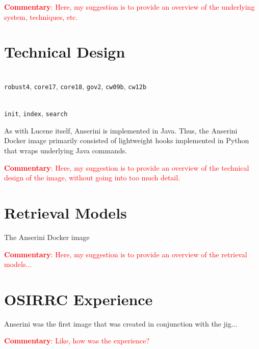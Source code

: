 \documentclass[sigconf]{acmart}
\newcommand{\red}[1]{\textcolor{red}{#1}}
\newcommand{\commentary}[1]{\noindent \red{{\bf Commentary}: #1}}
\begin{document}
\smallskip
\commentary{Here, my suggestion is to provide an overview of the underlying system, techniques, etc.}

\section{Technical Design}

\\
\texttt{robust4}, \texttt{core17}, \texttt{core18},
\texttt{gov2}, \texttt{cw09b}, \texttt{cw12b}

\smallskip {}\\
\texttt{init}, \texttt{index}, \texttt{search}

\smallskip \noindent
As with Lucene itself, Anserini is implemented in Java.
Thus, the Anserini Docker image primarily consisted of lightweight hooks implemented in Python that wraps underlying Java commands.

\smallskip
\commentary{Here, my suggestion is to provide an overview of the technical design of the image, without going into too much detail.}

\section{Retrieval Models}

The Anserini Docker image 

\smallskip
\commentary{Here, my suggestion is to provide an overview of the retrieval models...}


\section{OSIRRC Experience}

Anserini was the first image that was created in conjunction with the jig...

\smallskip
\commentary{Like, how was the experience?}




\end{document}
